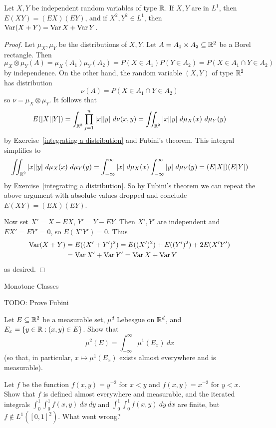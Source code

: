 \begin{corollary}
Let $X,Y$ be independent random variables of type $\mathbb{R}$. If $X,Y$ are in $L^1$, then $E(XY) = (EX)(EY)$, and if $X^2, Y^2 \in L^1$, then $\operatorname{Var}(X+Y) = \operatorname{Var} X + \operatorname{Var} Y$.
\end{corollary}
\begin{proof}
Let $\mu_X,\mu_Y$ be the distributions of $X,Y$.
Let $A = A_1 \times A_2 \subseteq \mathbb{R}^2$ be a Borel rectangle.
Then
\[\mu_{X} \otimes \mu_Y(A) = \mu_X(A_1) \mu_Y(A_2) = P(X \in A_1) P(Y \in A_2) = P(X \in A_1 \cap Y \in A_2)\]
by independence. On the other hand, the random variable $(X, Y)$ of type $\mathbb{R}^2$ has distribution
\[\nu(A) = P(X \in A_1 \cap Y \in A_2)\]
so $\nu = \mu_{X} \otimes \mu_Y$.
It follows that
\[E(|X||Y|) = \int_{\mathbb{R}^2} \prod_{j=1}^{n} |x||y| ~d\nu(x, y) = \iint_{\mathbb{R}^2} |x||y| ~d\mu_X(x)~d\mu_Y(y)\]
by Exercise~\ref{integrating a distribution} and Fubini's theorem. This integral simplifies to
\[\iint_{\mathbb{R}^2} |x||y| ~d\mu_X(x)~d\mu_Y(y) = \int_{-\infty}^{\infty} |x| ~d\mu_X(x) \int_{-\infty}^{\infty} |y| ~d\mu_Y(y) = (E|X|)(E|Y|)\]
by Exercise~\ref{integrating a distribution}.
So by Fubini's theorem we can repeat the above argument with absolute values dropped and conclude $E(XY) = (EX)(EY)$.

Now set $X' = X - EX$, $Y' = Y - EY$. Then $X',Y'$ are independent and $EX' = EY' = 0$, so $E(X'Y') = 0$.
Thus
\begin{align*}\operatorname{Var}(X + Y) &= E((X' + Y')^2) = E((X')^2) + E((Y')^2) + 2E(X'Y') \\
&= \operatorname{Var} X' + \operatorname{Var} Y' = \operatorname{Var} X + \operatorname{Var} Y
\end{align*}
as desired.
\end{proof}

Monotone Classes

TODO: Prove Fubini

\begin{exercise}
Let $E \subseteq \mathbb{R}^2$ be a measurable set, $\mu^d$ Lebesgue on $\mathbb{R}^d$, and $E_{x} = \{y \in \mathbb{R}: (x, y) \in E\}$.
Show that
\[\mu^2(E) = \int_{-\infty}^{\infty} \mu^1(E_x)~dx\]
(so that, in particular, $x \mapsto \mu^1(E_x)$ exists almost everywhere and is measurable).
\end{exercise}

\begin{exercise}
Let $f$ be the function $f(x, y) = y^{-2}$ for $x < y$ and $f(x, y) = x^{-2}$ for $y < x$.
Show that $f$ is defined almost everywhere and measurable, and the iterated integrals $\int_0^1\int_0^1 f(x,y)~dx~dy$ and $\int_0^1\int_0^1 f(x,y)~dy~dx$ are finite, but $f \notin L^1([0, 1]^2)$.
What went wrong?
\end{exercise}

